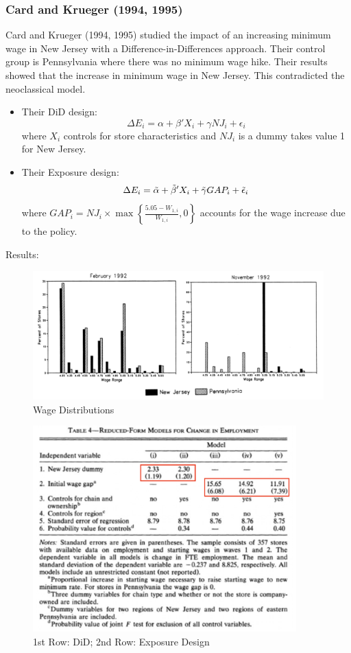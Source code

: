         \subsubsection{Card and Krueger (1994, 1995)}
            Card and Krueger (1994, 1995) studied the impact of an increasing minimum wage in New Jersey with a Difference-in-Differences approach. Their control group is Pennsylvania where there was no minimum wage hike. Their results showed that the increase in minimum wage  in New Jersey. This contradicted the neoclassical model.
            \begin{itemize}
                \item Their DiD design:
                $$\Delta E_i = \alpha + \beta 'X_i + \gamma NJ_i + \epsilon_i$$
                where $X_i$ controls for store characteristics and $NJ_i$ is a dummy takes value 1 for New Jersey.
                \item Their Exposure design:
                $$\Delta E_i = \Tilde{\alpha} +\Tilde{\beta} 'X_i +\Tilde{\gamma} GAP_i + \Tilde{\epsilon}_i$$
                where $GAP_i = NJ_i \times \max \left\{\frac{5.05 - W_{1,i}}{W_{1,i}},0\right\}$ accounts for the wage increase due to the policy.
            \end{itemize}
            Results:
            \begin{figure}[H]
                \centering
                \includegraphics[width=5in]{images/ch2/New Jersey.png}
                \caption{Wage Distributions}
            \end{figure}
            \begin{figure}[H]
                \centering
                \includegraphics[width=4in]{images/ch2/New_Jersey 2.png}
                \caption{1st Row: DiD; 2nd Row: Exposure Design}
            \end{figure}
